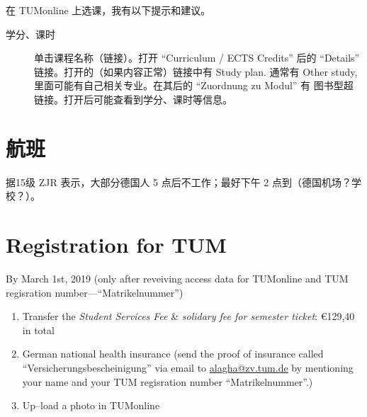 \documentclass{article}
\begin{document}
在 TUMonline 上选课，我有以下提示和建议。
\begin{description}
\item[学分、课时] 单击课程名称（链接）。打开 ``Curriculum /
ECTS Credits'' 后的 ``Details'' 链接。打开的（如果内容正常）链接中有 Study plan. 通常有 Other study, 里面可能有自己相关专业。在其后的 ``Zuordnung zu Modul'' 有
图书型超链接。打开后可能查看到学分、课时等信息。
\end{description}

\section{航班}
据15级 ZJR 表示，大部分德国人 5 点后不工作；最好下午 2 点到（德国机场？学校？）。

\section{Registration for TUM}
By March 1st, 2019 (only after reveiving access data for TUMonline and TUM regisration number---``Matrikelnummer'')
\begin{enumerate}
\item Transfer the \emph{Student Services Fee} \& \emph{solidary fee for semester ticket}: \euro{129,40} in total
\item German national health insurance (send the proof of insurance called ``Versicherungsbescheinigung'' via email to \href{mailto:alagha@zv.tum.de}{alagha@zv.tum.de} by mentioning your name and your TUM regisration number ``Matrikelnummer''.)
\item Up--load a photo in TUMonline
\end{enumerate}
\end{document}
